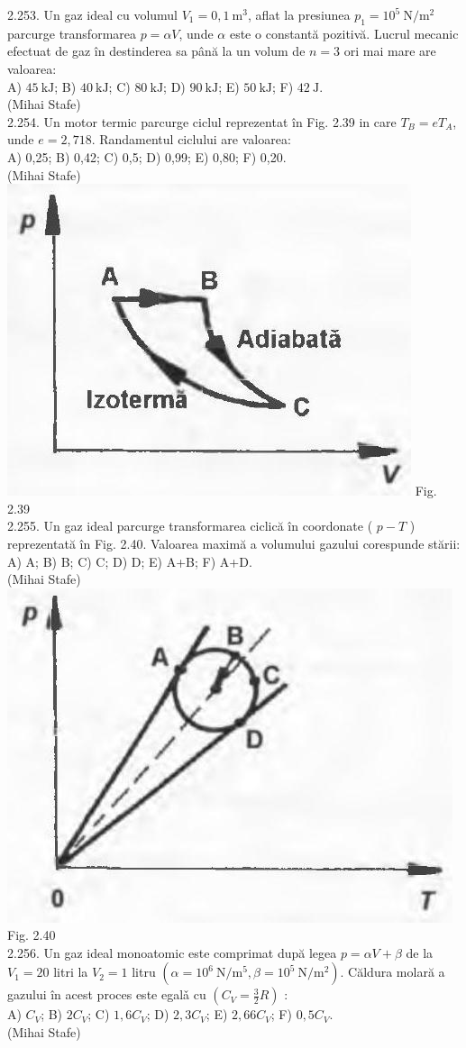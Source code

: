 2.253. Un gaz ideal cu volumul $V_{1}=0,1 \mathrm{~m}^{3}$, aflat la presiunea $p_{1}=10^{5} \mathrm{~N} / \mathrm{m}^{2}$ parcurge transformarea $p=\alpha V$, unde $\alpha$ este o constantă pozitivă. Lucrul mecanic efectuat de gaz în destinderea sa până la un volum de $n=3$ ori mai mare are valoarea:\\ A) $45 \mathrm{~kJ}$; B) $40 \mathrm{~kJ}$; C) $80 \mathrm{~kJ}$; D) $90 \mathrm{~kJ}$; E) $50 \mathrm{~kJ}$; F) $42 \mathrm{~J}$.\\ (Mihai Stafe)\\

2.254. Un motor termic parcurge ciclul reprezentat în Fig. 2.39 in care $T_{B}=e T_{A}$, unde $e=2,718$. Randamentul ciclului are valoarea:\\ A) 0,25; B) 0,42; C) 0,5; D) 0,99; E) 0,80; F) 0,20.\\ (Mihai Stafe)\\ \includegraphics[width=0.4\linewidth]{images/2025_07_01_5b3ff9fa0d508c8e9f17g-131(1)} Fig. 2.39\\

2.255. Un gaz ideal parcurge transformarea ciclică în coordonate ( $p-T$ ) reprezentată în Fig. 2.40. Valoarea maximă a volumului gazului corespunde stării:\\ A) A; B) B; C) C; D) D; E) A+B; F) A+D.\\ (Mihai Stafe)\\ \includegraphics[width=0.4\linewidth]{images/2025_07_01_5b3ff9fa0d508c8e9f17g-131} Fig. 2.40\\

2.256. Un gaz ideal monoatomic este comprimat după legea $p=\alpha V+\beta$ de la $V_{1}=20$ litri la $V_{2}=1$ litru $\left(\alpha=10^{6} \mathrm{~N} / \mathrm{m}^{5}, \beta=10^{5} \mathrm{~N} / \mathrm{m}^{2}\right)$. Căldura molară a gazului în acest proces este egalǎ cu $\left(C_{V}=\frac{3}{2} R\right)$ :\\ A) $C_{V}$; B) $2 C_{V}$; C) $1,6 C_{V}$; D) $2,3 C_{V}$; E) $2,66 C_{V}$; F) $0,5 C_{V}$.\\ (Mihai Stafe)\\

